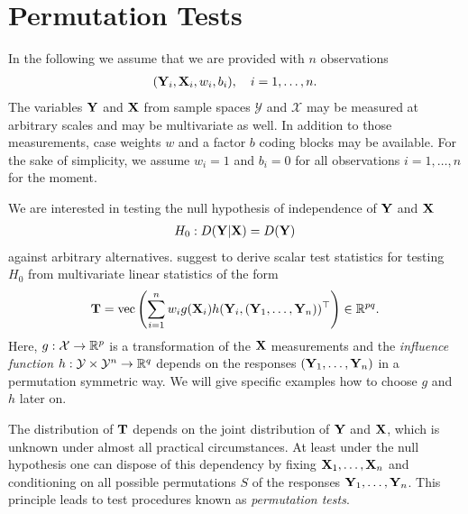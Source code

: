 \documentclass[letter]{article}
\begin{document}
\section{Permutation Tests}

In the following we assume that we are provided with $n$ observations 
\begin{eqnarray*}
(\mathbf{Y}_i, \mathbf{X}_i, w_i, b_i), \quad i = 1, \dots, n.
\end{eqnarray*}
The variables $\mathbf{Y}$ and $\mathbf{X}$ from sample spaces $\mathcal{Y}$ and
$\mathcal{X}$ may
be measured at arbitrary scales and may be multivariate as well. In addition
to those measurements, case weights $w$ and a factor $b$ coding blocks may
be available. For the sake of simplicity, we assume $w_i = 1$ and $b_i = 0$
for all observations $i = 1, \dots, n$ for the moment. 

We are interested in testing the null hypothesis of independence of $\mathbf{Y}$ and
$\mathbf{X}$
\begin{eqnarray*}
H_0: D(\mathbf{Y} | \mathbf{X}) = D(\mathbf{Y})
\end{eqnarray*}
against arbitrary alternatives. \cite{StrasserWeber1999} suggest to derive
scalar test statistics for testing $H_0$ from multivariate linear statistics
of the form 
\begin{eqnarray} \label{linstat}
\mathbf{T} = \text{vec}\left(\sum_{i = 1}^n w_i g(\mathbf{X}_i) h(\mathbf{Y}_i, (\mathbf{Y}_1, \dots, \mathbf{Y}_n))^\top\right)
\in \mathbb{R}^{pq}.
\end{eqnarray}
Here, $g: \mathcal{X} \rightarrow \mathbb{R}^{p}$ is a transformation of
the $\mathbf{X}$ measurements and the \emph{influence function}
$h: \mathcal{Y} \times \mathcal{Y}^n \rightarrow
\mathbb{R}^q$ depends on the responses $(\mathbf{Y}_1, \dots, \mathbf{Y}_n)$ in a permutation
symmetric way. We will give specific examples how to choose $g$ and $h$
later on.

The distribution of $\mathbf{T}$  depends on the joint
distribution of $\mathbf{Y}$ and $\mathbf{X}$, which is unknown under almost all practical
circumstances. At least under the null hypothesis one can dispose of this
dependency by fixing $\mathbf{X}_1, \dots, \mathbf{X}_n$ and conditioning on all possible
permutations $S$ of the responses $\mathbf{Y}_1, \dots, \mathbf{Y}_n$. 
This principle leads to test procedures known
as \textsl{permutation tests}. 
\end{document}
